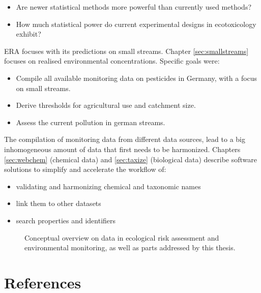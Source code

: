 \begin{itemize}
	\item Are newer statistical methods more powerful than currently used methods?
	\item How much statistical power do current experimental designs in ecotoxicology exhibit?
\end{itemize}

\noindent
ERA focuses with its predictions on small streams. Chapter \ref{sec:smallstreams} focuses on realised environmental concentrations.
Specific goals were:
\begin{itemize}
	\item Compile all available monitoring data on pesticides in Germany, with a focus on small streams.
	\item Derive thresholds for agricultural use and catchment size.
	\item Assess the current pollution in german streams.
\end{itemize}

\noindent
The compilation of monitoring data from different data sources, lead to a big inhomogeneous amount of data that first needs to be harmonized.
Chapters \ref{sec:webchem} (chemical data) and \ref{sec:taxize} (biological data) describe software solutions to simplify and accelerate the workflow of:

\begin{itemize}
	\item validating and harmonizing chemical and taxonomic names
	\item link them to other datasets
	\item search properties and identifiers
\end{itemize}


\begin{figure}[h]
	\centering
	\resizebox{\textwidth}{!}{%
		
	}
	\caption[Conceptual overview of the topics addressed by this thesis]{Conceptual overview on data in ecological risk assessment and environmental monitoring, as well as parts addressed by this thesis.}
	\label{fig:intro:overview}
\end{figure}

\section{References}
\printbibliography[heading=none]
